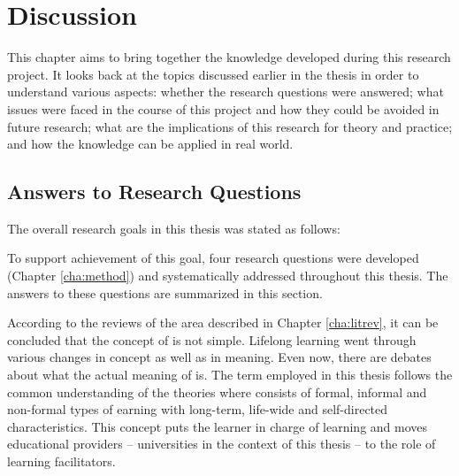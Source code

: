 \chapter{Discussion\label{cha:discussion}}
This chapter aims to bring together the knowledge developed during this research
project. It looks back at the topics discussed earlier in the thesis in order to
understand various aspects: whether the research questions were answered; what
issues were faced in the course of this project and how they could be avoided in
future research; what are the implications of this research for theory and
practice; and how the knowledge can be applied in real world.

\section{Answers to Research Questions}

The overall research goals in this thesis was stated as follows:


To support achievement of this goal, four research questions were developed
(Chapter \ref{cha:method}) and systematically addressed throughout this thesis.
The answers to these questions are summarized in this section.


According to the reviews of the area described in Chapter \ref{cha:litrev}, it
can be concluded that the concept of \LLLs is not simple. Lifelong learning
went through various changes in concept as well as in meaning. Even now,
there are debates about what the actual meaning of \LLLs is. The term employed
in this thesis follows the common understanding of the theories where \LLLs
consists of formal, informal and non-formal types of  earning with long-term,
life-wide and self-directed characteristics. This concept puts the learner in
charge of learning and moves educational providers -- universities in the
context of this thesis -- to the role of learning facilitators.

